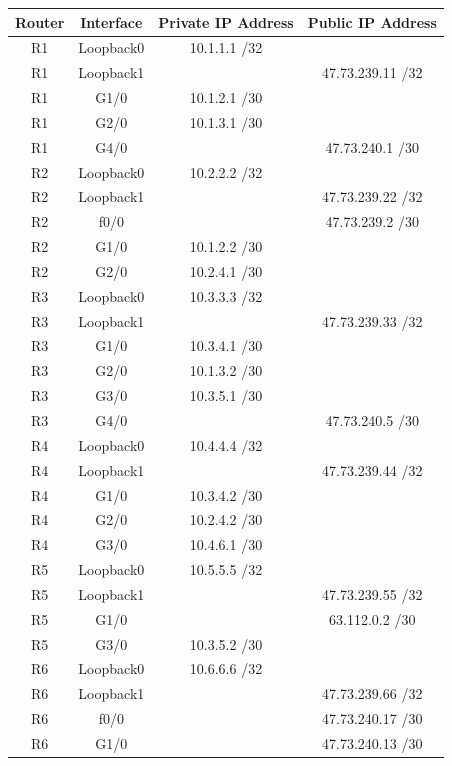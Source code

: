 \documentclass[11pt,english, openright, oneside]{book}
\begin{document}
\begin{table}[H]
\centering
\begin{tabular}{|c|c|c|c|}
\hline
\textbf{Router} & \textbf{Interface} & \textbf{Private IP Address} & \textbf{Public IP Address} \\ \hline
R1 & Loopback0 & 10.1.1.1 /32 & \\ \hline
R1 & Loopback1 & & 47.73.239.11 /32 \\ \hline
R1 & G1/0 & 10.1.2.1 /30 & \\ \hline
R1 & G2/0 & 10.1.3.1 /30 & \\ \hline
R1 & G4/0 &  & 47.73.240.1 /30 \\ \hline
R2 & Loopback0 & 10.2.2.2 /32 & \\ \hline
R2 & Loopback1 & & 47.73.239.22 /32 \\ \hline
R2 & f0/0 & & 47.73.239.2 /30 \\ \hline
R2 & G1/0 & 10.1.2.2 /30 & \\ \hline
R2 & G2/0 & 10.2.4.1 /30 & \\ \hline
R3 & Loopback0 & 10.3.3.3 /32 & \\ \hline
R3 & Loopback1 & & 47.73.239.33 /32  \\ \hline
R3 & G1/0 & 10.3.4.1 /30 & \\ \hline
R3 & G2/0 & 10.1.3.2 /30 & \\ \hline
R3 & G3/0 & 10.3.5.1 /30 & \\ \hline
R3 & G4/0 & & 47.73.240.5 /30 \\ \hline
R4 & Loopback0 & 10.4.4.4 /32 & \\ \hline
R4 & Loopback1 & & 47.73.239.44 /32 \\ \hline
R4 & G1/0 & 10.3.4.2 /30 & \\ \hline
R4 & G2/0 & 10.2.4.2 /30 & \\ \hline
R4 & G3/0 & 10.4.6.1 /30 & \\ \hline
R5 & Loopback0 & 10.5.5.5 /32 & \\ \hline
R5 & Loopback1 & & 47.73.239.55 /32 \\ \hline
R5 & G1/0 & & 63.112.0.2 /30 \\ \hline
R5 & G3/0 & 10.3.5.2 /30 & \\ \hline
R6 & Loopback0 & 10.6.6.6 /32 & \\ \hline
R6 & Loopback1 & & 47.73.239.66 /32 \\ \hline
R6 & f0/0 & & 47.73.240.17 /30 \\ \hline
R6 & G1/0 & & 47.73.240.13 /30 \\ \hline

\end{tabular}
\end{table}
\end{document}
